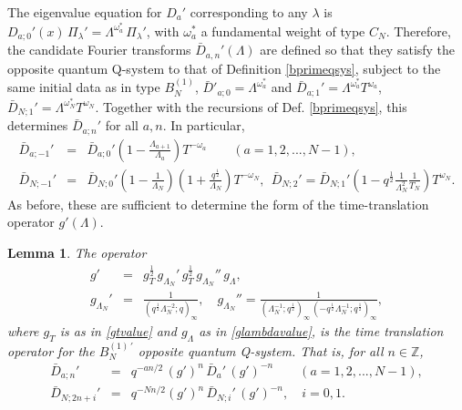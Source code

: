 \documentclass[12pt]{amsart}
\newtheorem{lemma}[thm]{Lemma}
\newcommand{\barD}{\bar D}
\newcommand{\Z}{{\mathbb Z}}
\newcommand{\lL}{{\Lambda}}
\newcommand{\half}{\frac{1}{2}}
\numberwithin{equation}{section}
\begin{document}
The eigenvalue equation for  $D_a'$ corresponding to any $\lambda$ is
$D_{a;0}'(x)\, \Pi_\lambda'= \lL^{\omega_a^*} \, \Pi_\lambda'$,
with $\omega_a^*$  a fundamental weight of  type $C_N$. Therefore, 
%
the candidate Fourier transforms $\barD_{a,n}'(\Lambda)$ are defined  so that they satisfy the opposite quantum Q-system to that of Definition \ref{bprimeqsys}, subject to the same initial data as in type $B_N^{(1)}$,
$\barD'_{a;0}=\lL^{\omega_a^*}$ and
%
%
$\barD_{a;1}'=\lL^{\omega_a^*}T^{\omega_a}$,
%
$\barD_{N;1}'=\lL^{\omega_N^*}T^{\omega_N}$.
%
%
%
Together with the recursions of Def. \ref{bprimeqsys}, this determines $\barD_{a;n}'$ for all $a,n$.
%
In particular,
\begin{eqnarray*}
%
\barD_{a;-1}'&=&\barD_{a;0}'\left( 1-\frac{\lL_{a+1}}{\lL_a}\right) T^{-\omega_a} \qquad (a=1,2,...,N-1),\\
\barD_{N;-1}'&=&\barD_{N;0}'\left(1-\frac{1}{\lL_N}\right)\left(1+\frac{q^\half}{\lL_N}\right) T^{-\omega_N}, \ \ 
%
%
\barD_{N;2}'
%
=\barD_{N;1}' \left(1-q^\half\frac{1}{\lL_N^2}\frac{1}{T_{N} }\right)T^{\omega_N}.
%
%
%
\end{eqnarray*}
As before, these are sufficient to determine the form of the time-translation operator $g'(\Lambda)$.
\begin{lemma}
The operator
\begin{eqnarray}
g'&=&g_T^\half \, g_{\lL_N}' \, g_T^\half \, g_{\lL_N}'' \, g_\lL ,\label{gprime}\\
g_{\lL_N}' &=&
\frac{1}{(q^\half\lL_N^{-2};q)_\infty}
%
,\quad g_{\lL_N}'' =
\frac{1}{(\lL_N^{-1};q^\half)_\infty \, (-q^\half \lL_N^{-1};q^\half)_\infty},
%
\nonumber
\end{eqnarray}
where $g_T$ is as in \eqref{gtvalue} and  $g_\lL$ as in \eqref{glambdavalue},
is the time translation operator for the $B_N^{(1) \, '}$ opposite quantum Q-system. That is, for all $n\in \Z$,
\begin{eqnarray*} \barD_{a;n}'&=& q^{-an/2} \, (g')^n\, \barD_{a}'\, (g')^{-n} \qquad (a=1,2,...,N-1) ,\\
\barD_{N;2n+i}'&=& q^{-Nn/2} (g')^n\, \barD_{N;i}'\, (g')^{-n} ,\quad i=0,1.
%
\end{eqnarray*}
\end{lemma}
%
%
%
\end{document}
